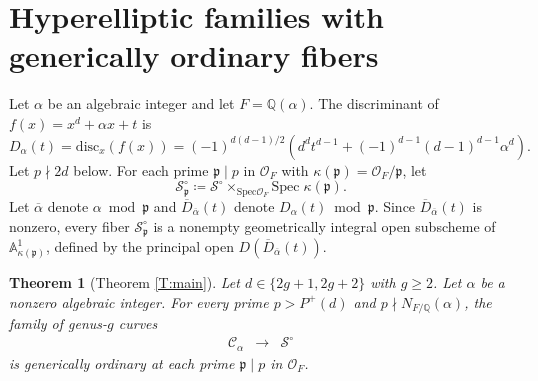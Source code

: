 \documentclass{amsart}
\theoremstyle{plain}
\newtheorem{theorem}{Theorem}[section]
\theoremstyle{remark}
\theoremstyle{remark}
\newcommand{\fp}{\mathfrak{p}}
\newcommand{\cS}{\mathcal{S}}
\newcommand{\cO}{\mathcal{O}}
\newcommand{\cC}{\mathcal{C}}
\newcommand{\Spec}{\mathrm{Spec}}
\newcommand{\disc}{\mathrm{disc}}
\renewcommand{\bar}{\overline}
\newcommand{\0}{\mathbf{0}}
\newcommand{\1}{\mathbf{1}}
\newcommand{\A}{\mathbb{A}}
\newcommand{\Q}{\mathbb{Q}}
\begin{document}
\section{Hyperelliptic families 
with generically ordinary fibers}

Let $\alpha$ be an algebraic integer and let  $F=\Q(\alpha)$.
The discriminant of $f(x)=x^d+\alpha x+t$ is
\begin{equation}\label{E:Disc}
D_\alpha(t)=\disc_x(f(x))=
(-1)^{d(d-1)/2}(d^dt^{d-1}+(-1)^{d-1}(d-1)^{d-1}\alpha^d).
\end{equation}
Let $p\nmid 2d$ below.
For each prime $\fp\mid p$ in $\cO_F$ with  $\kappa(\fp)=\cO_F/\fp$, let
$$
\cS_\fp^\circ \coloneqq \cS^\circ \times_{\Spec{\cO_F}} 
\Spec\; \kappa(\fp). 
$$
Let $\bar\alpha$ denote $\alpha\bmod \fp$ and 
$\bar{D}_{\bar\alpha}(t)$ denote 
$D_\alpha(t)\bmod \fp$.
Since $\bar{D}_{\bar\alpha}(t)$ is nonzero,
every fiber $\cS^\circ_\fp$ is a nonempty geometrically integral open 
subscheme of $\A^1_{\kappa(\fp)}$, defined by the principal open 
$D(\bar{D}_{\bar{\alpha}}(t))$.

\begin{theorem}[Theorem \ref{T:main}]
\label{T:main2}
Let $d\in\{2g+1,2g+2\}$ with $g\ge 2$.
Let $\alpha$ be a nonzero algebraic integer. 
For every prime $p>P^+(d)$ and $p\nmid N_{F/\Q}(\alpha)$, 
the family of genus-$g$
curves 
\begin{eqnarray*}
\cC_\alpha &\longrightarrow & \cS^\circ
\end{eqnarray*}
is generically ordinary at each prime $\fp\mid p$ in $\cO_F$. 
\end{theorem}
\end{document}
